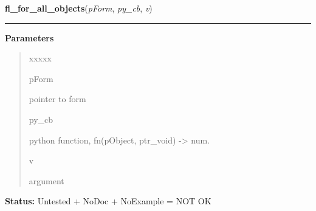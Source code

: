 \hspace{.8\funcindent}\begin{boxedminipage}{\funcwidth}

    \raggedright \textbf{fl\_for\_all\_objects}(\textit{pForm}, \textit{py\_cb}, \textit{v})

    \vspace{-1.5ex}

    \rule{\textwidth}{0.5\fboxrule}
\setlength{\parskip}{2ex}
\setlength{\parskip}{1ex}
      \textbf{Parameters}
      \vspace{-1ex}

      \begin{quote}
        \begin{Ventry}{xxxxx}

          \item[pForm]

          pointer to form

          \item[py\_cb]

          python function, fn(pObject, ptr\_void) -{\textgreater} num.

          \item[v]

          argument

        \end{Ventry}

      \end{quote}

\textbf{Status:} Untested + NoDoc + NoExample = NOT OK



    \end{boxedminipage}

    \label{xformslib:library:fl_draw_object_label_outside}

    \vspace{0.5ex}

